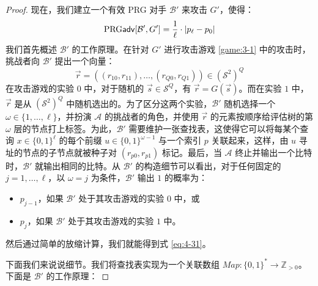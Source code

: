 \begin{proof}
现在，我们建立一个有效 PRG 对手 $\mathcal{B}'$ 来攻击 $G'$，使得：
\begin{equation}\label{eq:4-31}
{\rm PRG\mathsf{adv}}[\mathcal{B}',G']=\frac{1}{\ell}\cdot|p_\ell-p_0|
\end{equation}
我们首先概述 $\mathcal{B}'$ 的工作原理。在针对 $G'$ 进行攻击游戏 \ref{game:3-1} 中的攻击时，挑战者向 $\mathcal{B}'$ 提出一个向量：
\begin{equation}\label{eq:4-32}
\vec{r}=((r_{10},r_{11}),\dots,(r_{Q0},r_{Q1}))\in(\mathcal{S}^2)^Q
\end{equation}
在攻击游戏的实验 $0$ 中，对于随机的 $\vec{s}\in\mathcal{S}^Q$，有 $\vec{r}=G(\vec{s})$。而在实验 $1$ 中，$\vec{r}$ 是从 $(\mathcal{S}^2)^Q$ 中随机选出的。为了区分这两个实验，$\mathcal{B}'$ 随机选择一个 $\omega\in\{1,\dots,\ell\}$，并扮演 $\mathcal{A}$ 的挑战者的角色，并使用 $\vec r$ 的元素按顺序给评估树的第 $\omega$ 层的节点打上标签。为此，$\mathcal{B}'$ 需要维护一张查找表，这使得它可以将每某个查询 $x\in\{0,1\}^\ell$ 的每个前缀 $u\in\{0,1\}^{\omega-1}$ 与一个索引 $p$ 关联起来，这样，由 $u$ 寻址的节点的子节点就被种子对 $(r_{p0},r_{p1})$ 标记。最后，当 $\mathcal{A}$ 终止并输出一个比特时，$\mathcal{B}'$ 就输出相同的比特。从 $\mathcal{B}'$ 的构造细节可以看出，对于任何固定的 $j=1,\dots,\ell$，以 $\omega=j$ 为条件，$\mathcal{B}'$ 输出 $1$ 的概率为：
\begin{itemize}
	\item $p_{j-1}$，如果 $\mathcal{B}'$ 处于其攻击游戏的实验 $0$ 中，或
	\item $p_j$，如果 $\mathcal{B}'$ 处于其攻击游戏的实验 $1$ 中。
\end{itemize}
然后通过简单的放缩计算，我们就能得到式 \ref{eq:4-31}。

下面我们来说说细节。我们将查找表实现为一个关联数组 $Map:\{0,1\}^*\to\mathbb{Z}_{>0}$。下面是 $\mathcal{B}'$ 的工作原理：

\vspace{5pt}


\end{proof}
